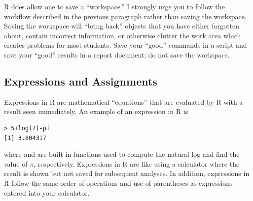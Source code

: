 \documentclass[10pt,openany]{book}\usepackage[]{graphicx}\usepackage[]{color}
\makeatletter
\newenvironment{kframe}{%
 \def\at@end@of@kframe{}%
 \ifinner\ifhmode%
  \def\at@end@of@kframe{\end{minipage}}%
  \begin{minipage}{\columnwidth}%
 \fi\fi%
 \def\FrameCommand##1{\hskip\@totalleftmargin \hskip-\fboxsep
 \colorbox{shadecolor}{##1}\hskip-\fboxsep
     \hskip-\linewidth \hskip-\@totalleftmargin \hskip\columnwidth}%
 \MakeFramed {\advance\hsize-\width
   \@totalleftmargin\z@ \linewidth\hsize
   \@setminipage}}%
 {\par\unskip\endMakeFramed%
 \at@end@of@kframe}
\newenvironment{knitrout}{}{} %
\makeatother
\begin{document}
R does allow one to save a ``workspace.''  I strongly urge you to follow the workflow described in the previous paragraph rather than saving the workspace.  Saving the workspace will ``bring back'' objects that you have either forgotten about, contain incorrect information, or otherwise clutter the work area which creates problems for most students.  Save your ``good'' commands in a script and save your ``good'' results in a report document; do not save the workspace.


\vspace{-8pt}
\subsection{Expressions and Assignments} \label{sect:RExprAssn}
\vspace{-8pt}
Expressions in R are mathematical ``equations'' that are evaluated by R with a result seen immediately.  An example of an expression in R is
\begin{knitrout}
\color{fgcolor}\begin{kframe}
\begin{verbatim}
> 5+log(7)-pi
[1] 3.804317
\end{verbatim}
\end{kframe}
\end{knitrout}

where  and  are built-in functions used to compute the natural log and find the value of $\pi$, respectively.  Expressions in R are like using a calculator where the result is shown but not saved for subsequent analyses.  In addition, expressions in R follow the same order of operations and use of parentheses as expressions entered into your calculator.

\end{document}
